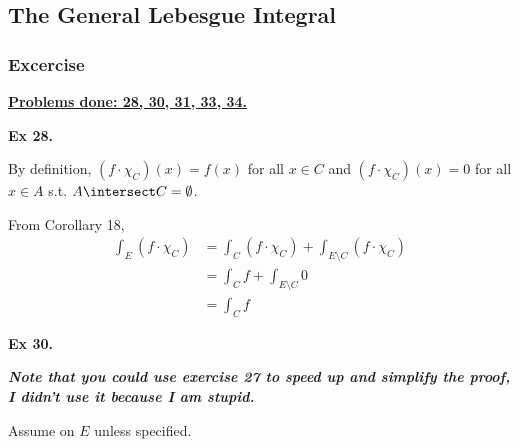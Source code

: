 \newcommand{\LHS}{\text{LHS}}
\newcommand{\RHS}{\text{RHS}}

\subsection{The General Lebesgue Integral}
\subsubsection{Excercise}

\underline{\textbf{Problems done: 28, 30, 31, 33, 34.}}
\bigskip



\noindent {} \textbf{Ex 28.} \label{ex:4_28}

By definition, $(f\cdot \chi_C)(x) = f(x)$ for all $x\in C$ and $(f\cdot \chi_C)(x) = 0$ for all $x\in A$ s.t. $A \intersect C = \emptyset$.

From Corollary 18,
\begin{align*}
    \int_E (f \cdot \chi_C) &= \int_C (f \cdot \chi_C) + \int_{E\setminus C} (f \cdot \chi_C)\\
    &= \int_C f + \int_{E\setminus C} 0 \\
    &= \int_C f
\end{align*}


\noindent {} \textbf{Ex 30.} \label{ex:4_30}

\textbf{\textit{Note that you could use exercise 27 to speed up and simplify the proof, I didn't use it because I am stupid.}}

Assume on $E$ unless specified.

